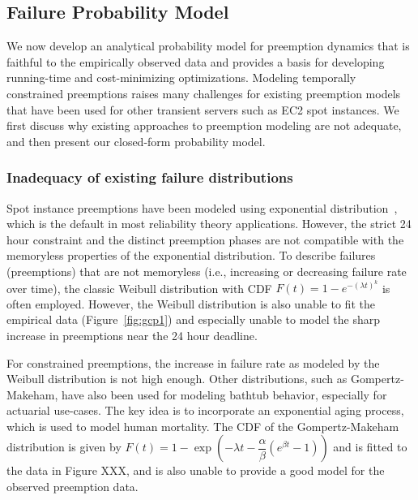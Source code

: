 
\vspace*{\subsecspace}
\subsection{Failure Probability Model}
\label{subsec:analytical-model}


  
We now develop an analytical probability model for preemption dynamics that is faithful to the empirically observed data and provides a basis for developing running-time and cost-minimizing optimizations. %
Modeling temporally constrained preemptions raises many challenges for existing preemption models that have been used for other transient servers such as EC2 spot instances. 
We first discuss why existing approaches to preemption modeling are not adequate, and then present our closed-form probability model. 


\subsubsection{Inadequacy of existing failure distributions}

Spot instance preemptions have been modeled using exponential distribution~\cite{sigcomm-bidcloud, hotcloud-notbid, flint}, which is the default in most reliability theory applications. 
However, the strict 24 hour constraint and the distinct preemption phases are not compatible with the memoryless properties of the exponential distribution. 
%
To describe failures (preemptions) that are not memoryless (i.e., increasing or decreasing failure rate over time), the classic Weibull distribution with CDF $F(t)=1-e^{-(\lambda t)^k}$ is often employed. However, the Weibull distribution is also unable to fit the empirical data (Figure~\ref{fig:gcp1}) and especially unable to model the sharp increase in preemptions near the 24 hour deadline. 

For constrained preemptions, the increase in failure rate as modeled by the Weibull distribution is not high enough.
Other distributions, such as Gompertz-Makeham, have also been used for modeling bathtub behavior, especially  for actuarial use-cases.
The key idea is to incorporate an exponential aging process, which is used to model human mortality.
The CDF of the Gompertz-Makeham distribution is given by $F(t) = 1 - \exp\left(-\lambda t - \dfrac{\alpha}{\beta}(e^{\beta t} - 1) \right)$
  and is fitted to the data in Figure XXX, and is also unable to provide a good model for the observed preemption data. 

